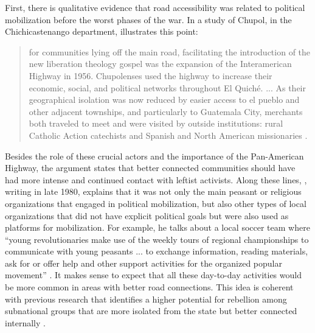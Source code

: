 \documentclass[12pt, notitlepage]{article}
\begin{document}

First, there is qualitative evidence that road accessibility was related to political mobilization before the worst phases of the war.
In a study of Chupol, in the Chichicastenango department, \citet{Esparza:2018uw} illustrates this point:

\begin{quote}
  for communities lying off the main road, facilitating the introduction of the new liberation theology gospel was the expansion of the Interamerican Highway in 1956. Chupolenses used the highway to increase their economic, social, and political networks throughout El Quiché. ... As their geographical isolation was now reduced by easier access to el pueblo and other adjacent townships, and particularly to Guatemala City, merchants both traveled to meet and were visited by outside institutions: rural Catholic Action catechists and Spanish and North American missionaries \citep[93--94]{Esparza:2018uw}.
\end{quote}


Besides the role of these crucial actors and the importance of the Pan-American Highway, the argument states that better connected communities should have had more intense and continued contact with leftist activists.
Along these lines, \citet{Bran:1985tc}, writing in late 1980, explains that it was not only the main peasant or religious organizations that engaged in political mobilization, but also other types of local organizations that did not have explicit political goals but were also used as platforms for mobilization.
For example, he talks about a local soccer team where ``young revolutionaries make use of the weekly tours of regional championships to communicate with young peasants ... to exchange information, reading materials, ask for or offer help and other support activities for the organized popular movement'' \citep[15]{Bran:1985tc}.
It makes sense to expect that all these day-to-day activities would be more common in areas with better road connections.
This idea is coherent with previous research that identifies a higher potential for rebellion among subnational groups that are more isolated from the state but better connected internally \citep{Muller-Crepon:2021va}.
\end{document}
